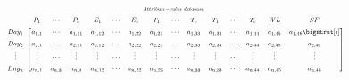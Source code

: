 \[
  \setlength{\arraycolsep}{0pt}%
  \renewcommand{\arraystretch}{1.5}%
  \resizebox{.8\textwidth}{!}{
  $
  \begin{array}{ *{8}{c} }
    \scriptstyle Attribute-value \: database %
     \\
    \begin{blockarray}{ccccccccccccccccc}
    & P_1 & \cdots & P_c & E_1 & \cdots & E_c  &
    T_1 & \cdots & T_c & T_1 & \cdots & T_c & WL & SF
    \\
    \begin{block}{c[cccccccccccccccc]}
    Day_1 & a_{1,1}&\cdots&a_{1,11}&
    a_{1,12} & \cdots &a_{1,22} &
    a_{1,23} & \cdots &a_{1,33} &
    a_{1,34} & \cdots &a_{1,44} &
    a_{1,45} & a_{1,46}
    \bigstrut[t] \\

    Day_2 & a_{2,1} &\cdots&a_{2,11}&
    a_{2,12} & \cdots &a_{2,22} &
    a_{2,23} & \cdots &a_{2,33} &
    a_{2,34} & \cdots &a_{2,44} &
    a_{2,45} & a_{2,46}
    \\

    \vdots & \vdots & \cdots & \vdots & \vdots &
    \cdots & \vdots & \vdots &
    \cdots & \vdots & \vdots &
    \cdots & \vdots & \vdots & \vdots
    \\

    Day_n & a_{n,1}&a_{n,3}&a_{n,4}&
    a_{n,12} & \cdots & a_{n,22} &
    a_{n,23} & \cdots &a_{n,33} &
    a_{n,34} & \cdots &a_{n,44} &
    a_{n,45} & a_{n,46}
    \\
    \end{block}
    \end{blockarray}%
  \end{array}
  $
  }
\]
